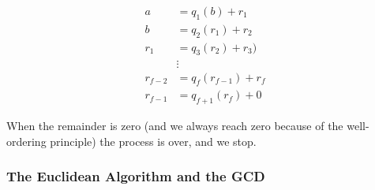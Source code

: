 \documentclass{article}
\begin{document}
\begin{align*} 
a &= q_1(b) + r_1 \\
b &= q_2(r_1) + r_2 \\
r_1 &= q_3(r_2) + r_3)\\
&\vdots \\
r_{f-2} &= q_{f}(r_{f-1}) + r_f \\
r_{f-1} &= q_{f+1}(r_f) + 0  
\end{align*} 

When the remainder is zero (and we always reach zero because of the well-ordering principle) the process is over, and we stop. 


\subsubsection*{The Euclidean Algorithm and the GCD} 
\end{document}
